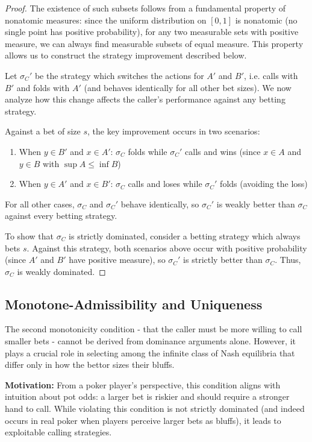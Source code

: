 \documentclass[../../main/main.tex]{subfiles}
\begin{document}
\begin{proof}
    The existence of such subsets follows from a fundamental property of nonatomic measures: since the uniform distribution on $[0,1]$ is nonatomic (no single point has positive probability), for any two measurable sets with positive measure, we can always find measurable subsets of equal measure\cite{Sierpinski1922}. This property allows us to construct the strategy improvement described below.

    Let $\sigma_C'$ be the strategy which switches the actions for $A'$ and $B'$, i.e. calls with $B'$ and folds with $A'$ (and behaves identically for all other bet sizes). We now analyze how this change affects the caller's performance against any betting strategy.

    Against a bet of size $s$, the key improvement occurs in two scenarios:
    \begin{enumerate}
        \item When $y \in B'$ and $x \in A'$: $\sigma_C$ folds while $\sigma_C'$ calls and wins (since $x \in A$ and $y \in B$ with $\sup A \leq \inf B$)
        \item When $y \in A'$ and $x \in B'$: $\sigma_C$ calls and loses while $\sigma_C'$ folds (avoiding the loss)
    \end{enumerate}

    For all other cases, $\sigma_C$ and $\sigma_C'$ behave identically, so $\sigma_C'$ is weakly better than $\sigma_C$ against every betting strategy.

    To show that $\sigma_C$ is strictly dominated, consider a betting strategy which always bets $s$. Against this strategy, both scenarios above occur with positive probability (since $A'$ and $B'$ have positive measure), so $\sigma_C'$ is strictly better than $\sigma_C$. Thus, $\sigma_C$ is weakly dominated.
\end{proof}

\subsection{Monotone-Admissibility and Uniqueness}

The second monotonicity condition - that the caller must be more willing to call smaller bets - cannot be derived from dominance arguments alone. However, it plays a crucial role in selecting among the infinite class of Nash equilibria that differ only in how the bettor sizes their bluffs.

\textbf{Motivation:} From a poker player's perspective, this condition aligns with intuition about pot odds: a larger bet is riskier and should require a stronger hand to call. While violating this condition is not strictly dominated (and indeed occurs in real poker when players perceive larger bets as bluffs), it leads to exploitable calling strategies.
\end{document}

